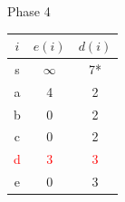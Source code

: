 \documentclass[hyperref={},
xcolor={dvipsnames,svgnames,table},10pt]{beamer}
\begin{document}
\begin{frame}{Phase 4}
\begin{minipage}[c]{0.3\linewidth}
	\end{minipage}\hfill 
	\begin{minipage}[c]{0.3\linewidth}
		\begin{tabular}{|c|c|c|}
			\hline
			$i$ & $e(i)$ & $d(i)$ \\ \hline
			s & $\infty$ & 7* \\ \hline
			a &  4 & 2 \\ \hline
			b &  0 & 2 \\ \hline
			c &  0 & 2 \\ \hline
			\textcolor{red}{d} &  \textcolor{red}{3} & \textcolor{red}{3} \\ \hline
			e &  0 & 3 \\ \hline
		\end{tabular}
	\end{minipage}
\end{frame}
\end{document}
